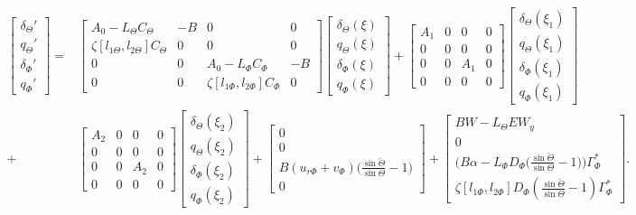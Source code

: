 \documentclass[../main.tex]{subfiles}
\begin{document}
	\begin{align}
	\begin{bmatrix}
	\delta_\Theta' \\
	q_\Theta' \\
	\delta_\Phi' \\
	q_\Phi' 
	\end{bmatrix} =&
	\begin{bmatrix}
	A_0 - L_\Theta C_\Theta & -B & 0 & 0\\
	\zeta [l_{1\Theta},l_{2\Theta}]C_\Theta & 0 & 0 & 0 \\
	0 & 0 & A_0 - L_\Phi C_\Phi & -B \\
	0 & 0 & \zeta [l_{1\Phi},l_{2\Phi}]C_\Phi &0
	\end{bmatrix}
	\begin{bmatrix}
	\delta_\Theta(\xi) \\
	q_\Theta (\xi) \\
	\delta_\Phi(\xi) \\
	q_\Phi(\xi)
	\end{bmatrix} + 
	\begin{bmatrix}
	A_1 & 0 & 0 & 0\\
	0 & 0 & 0 & 0 \\
	0 & 0 & A_1 & 0\\
	0 & 0 & 0 & 0 
	\end{bmatrix}
	\begin{bmatrix}
	\delta_\Theta(\xi_1) \\
	q_\Theta (\xi_1) \\
	\delta_\Phi(\xi_1) \\
	q_\Phi (\xi_1)
	\end{bmatrix} \nonumber \\
	+&\begin{bmatrix}
	A_2 & 0 & 0 & 0\\
	0 & 0 & 0 & 0 \\
	0 & 0 & A_2 & 0\\
	0 & 0 & 0 & 0 
	\end{bmatrix}
	\begin{bmatrix}
	\delta_\Theta(\xi_2) \\
	q_\Theta (\xi_2) \\
	\delta_\Phi(\xi_2) \\
	q_\Phi (\xi_2)
	\end{bmatrix} + 
	\begin{bmatrix}
	0 \\
	0 \\
	B(u_{r\Phi} + v_\Phi)\big(\frac{\sin \check{\Theta}}{\sin \Theta} - 1\big) \\
	0
	\end{bmatrix}
	+
	\begin{bmatrix}
	BW - L_{\Theta}EW_y\\
	0 \\
	 \big(B\alpha  - L_\Phi D_\Phi\big(\frac{\sin \check{\Theta}}{\sin \Theta} - 1\big)\big)\Gamma_\Phi^*\\
	\zeta[l_{1\Phi},l_{2\Phi}]D_\Phi (\frac{\sin \check{\Theta}}{\sin \Theta} - 1)\Gamma_\Phi^*
	\end{bmatrix}.
	\end{align}
\end{document}

